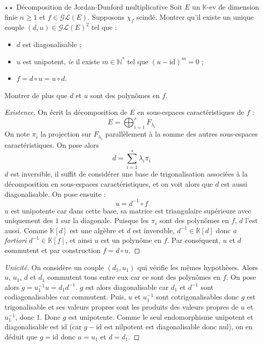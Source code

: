 \documentclass[french,a4paper]{article}
\newcommand{\N}{\mathbb{N}}
\newcommand{\K}{\mathbb{K}}
\newcommand{\st}{^*}
\newcommand{\inv}{^{-1}}
\theoremstyle{plain}
\theoremstyle{definition}
\theoremstyle{remark}
\begin{document}
\begin{ex}[LLG]{$\star\star$ Décomposition de Jordan-Dunford multiplicative}
	Soit $E$ un $\K$-ev de dimension finie $n\geqslant1$ et $f\in\mathcal{GL}(E)$. Supposons $\chi_f$ scindé. Montrer qu'il existe un unique couple $(d,u)\in\mathcal{GL}(E)^2$ tel que : \begin{itemize}
		\item $d$ est diagonalisable ;
		\item $u$ est unipotent, \textit{ie} il existe $m\in\N\st$ tel que $(u-\text{id})^m=0$ ;
		\item $f=d\circ u=u\circ d$.
	\end{itemize}
	Montrer de plus que $d$ et $u$ sont des polynômes en $f$.
\end{ex}
\begin{proof}[Existence]
	On écrit la décomposition de $E$ en sous-espaces caractéristiques de $f$ : $$E=\bigoplus_{i=1}^{s}F_{\lambda_i}$$ On note $\pi_i$ la projection sur $F_{\lambda_i}$ parallèlement à la somme des autres sous-espaces caractéristiques. On pose alors $$d=\sum_{i=1}^{s}\lambda_i\pi_i$$ $d$ est inversible, il suffit de considérer une base de trigonalisation associées à la décomposition en sous-espaces caractéristiques, et on voit alors que $d$ est aussi diagonalisable. On pose ensuite : $$u=d\inv\circ f$$ $u$ est unipotente car dans cette base, sa matrice est triangulaire supérieure avec uniquement des $1$ sur la diagonale. Puisque les $\pi_i$ sont des polynômes en $f$, $d$ l'est aussi. Comme $\K[d]$ est une algèbre et $d$ est inversible, $d\inv\in\K[d]$ donc \textit{a fortiori} $d\inv\in\K[f]$, et ainsi $u$ est un polynôme en $f$. Par conséquent, $u$ et $d$ commutent et par construction $f=d\circ u$.
\end{proof}
\begin{proof}[Unicité]
	On considère un couple $(d_1,u_1)$ qui vérifie les mêmes hypothèses. Alors $u$, $u_1$, $d$ et $d_1$ commutent tous entre eux car ce sont des polynômes en $f$. On pose alors $g=u_1\inv u=d_1d\inv$. $g$ est alors diagonalisable car $d_1$ et $d\inv$ sont codiagonalisables car commutent. Puis, $u$ et $u_1\inv$ sont cotrigonalisables donc $g$ est trigonalisable et ses valeurs propres sont les produits des valeurs propres de $u$ et $u_1\inv$, donc $1$. Donc $g$ est unipotente. Comme le seul endomorphisme unipotent et diagonalisable est $\text{id}$ (car $g-\text{id}$ est nilpotent est diagonalisable donc nul), on en déduit que $g=\text{id}$ donc $u=u_1$ et $d=d_1$.
\end{proof}
\end{document}
